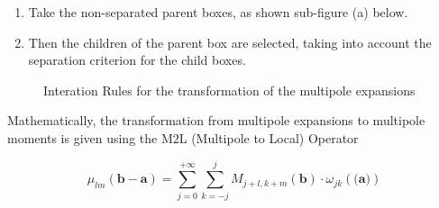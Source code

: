 \documentclass[12pt,twoside,a4paper]{report}
\begin{document}
	\begin{enumerate}	
	\item Take the non-separated parent boxes, as shown sub-figure (a) below.
	\item Then the children of the parent box are selected, taking into account the separation criterion for the child boxes.	
	\end{enumerate}	   
   
	 
 \begin{figure}[H]
    \centering 
    \caption{Interation Rules for the transformation of the multipole expansions}
    \label{fig:multipole}
   \end{figure}   
   
	  Mathematically, the transformation from multipole expansions to multipole moments is given using the  M2L (Multipole to Local) Operator
	  
	  \begin{equation}
	  \mu_{lm}(\textbf{b} - \textbf{a}) = \sum\limits_{j = 0}^{+\infty} \sum\limits_{k=-j}^{j}
	  M_{j+l,k+m}(\textbf{b}) \cdot \omega_{jk}(\textbf{(a)})
	  \end{equation}
   
\end{document}
